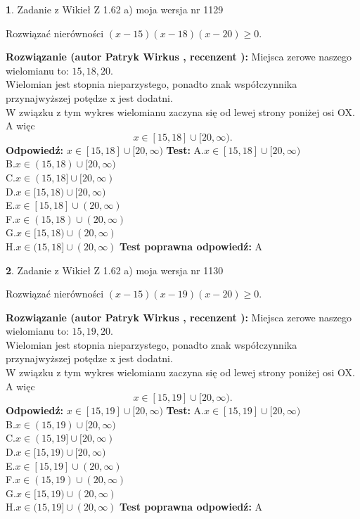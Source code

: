 \documentclass[12pt, a4paper]{article}
\theoremstyle{definition} %
\newtheorem{zad}{}
\newcommand{\zadStart}[1]{\begin{zad}#1\newline}
\newcommand{\zadStop}{\end{zad}}
\newcommand{\rozwStart}[2]{\noindent \textbf{Rozwiązanie (autor #1 , recenzent #2): }\newline}
\newcommand{\rozwStop}{\newline}
\newcommand{\odpStart}{\noindent \textbf{Odpowiedź:}\newline}
\newcommand{\odpStop}{\newline}
\newcommand{\testStart}{\noindent \textbf{Test:}\newline}
\newcommand{\testStop}{\newline}
\newcommand{\kluczStart}{\noindent \textbf{Test poprawna odpowiedź:}\newline}
\newcommand{\kluczStop}{\newline}
\begin{document}
\zadStart{Zadanie z Wikieł Z 1.62 a) moja wersja nr 1129}

Rozwiązać nierówności $(x-15)(x-18)(x-20)\ge0$.
\zadStop
\rozwStart{Patryk Wirkus}{}
Miejsca zerowe naszego wielomianu to: $15, 18, 20$.\\
Wielomian jest stopnia nieparzystego, ponadto znak współczynnika przy\linebreak najwyższej potędze x jest dodatni.\\ W związku z tym wykres wielomianu zaczyna się od lewej strony poniżej osi OX. A więc $$x \in [15,18] \cup [20,\infty).$$
\rozwStop
\odpStart
$x \in [15,18] \cup [20,\infty)$
\odpStop
\testStart
A.$x \in [15,18] \cup [20,\infty)$\\
B.$x \in (15,18) \cup [20,\infty)$\\
C.$x \in (15,18] \cup [20,\infty)$\\
D.$x \in [15,18) \cup [20,\infty)$\\
E.$x \in [15,18] \cup (20,\infty)$\\
F.$x \in (15,18) \cup (20,\infty)$\\
G.$x \in [15,18) \cup (20,\infty)$\\
H.$x \in (15,18] \cup (20,\infty)$
\testStop
\kluczStart
A
\kluczStop



\zadStart{Zadanie z Wikieł Z 1.62 a) moja wersja nr 1130}

Rozwiązać nierówności $(x-15)(x-19)(x-20)\ge0$.
\zadStop
\rozwStart{Patryk Wirkus}{}
Miejsca zerowe naszego wielomianu to: $15, 19, 20$.\\
Wielomian jest stopnia nieparzystego, ponadto znak współczynnika przy\linebreak najwyższej potędze x jest dodatni.\\ W związku z tym wykres wielomianu zaczyna się od lewej strony poniżej osi OX. A więc $$x \in [15,19] \cup [20,\infty).$$
\rozwStop
\odpStart
$x \in [15,19] \cup [20,\infty)$
\odpStop
\testStart
A.$x \in [15,19] \cup [20,\infty)$\\
B.$x \in (15,19) \cup [20,\infty)$\\
C.$x \in (15,19] \cup [20,\infty)$\\
D.$x \in [15,19) \cup [20,\infty)$\\
E.$x \in [15,19] \cup (20,\infty)$\\
F.$x \in (15,19) \cup (20,\infty)$\\
G.$x \in [15,19) \cup (20,\infty)$\\
H.$x \in (15,19] \cup (20,\infty)$
\testStop
\kluczStart
A
\kluczStop
\end{document}
